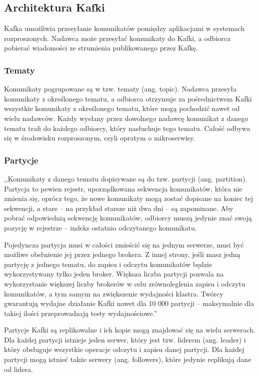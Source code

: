 \subsection{Architektura Kafki}

Kafka umożliwia przesyłanie komunikatów pomiędzy aplikacjami w systemach rozproszonych. Nadawca może przesyłać komunikaty do Kafki, a odbiorca pobierać wiadomości ze strumienia publikowanego przez Kafkę.

\subsubsection{Tematy}
Komunikaty pogrupowane są w tzw. tematy (ang. topic). Nadawca przesyła komunikaty z określonego tematu, a odbiorca otrzymuje za pośrednictwem Kafki wszystkie komunikaty z określonego tematu, które mogą pochodzić nawet od wielu nadawców. Każdy wysłany przez dowolnego nadawcę komunikat z danego tematu trafi do każdego odbiorcy, który nasłuchuje tego tematu. Całość odbywa się w środowisku rozproszonym, czyli opratym o mikroserwisy.\cite{Kafka}

\subsubsection{Partycje}
,,Komunikaty z danego tematu dopisywane są do tzw. partycji (ang. partition). Partycja to pewien rejestr, uporządkowana sekwencja komunikatów, która nie zmienia się, oprócz tego, że nowe komunikaty mogą zostać dopisane na koniec tej sekwencji, a stare – na przykład starsze niż dwa dni – są zapominane. Aby pobrać odpowiednią sekwencję komunikatów, odbiorcy muszą jedynie znać swoją pozycję w rejestrze – indeks ostatnio odczytanego komunikatu.

Pojedyncza partycja musi w całości zmieścić się na jednym serwerze, musi być możliwe obsłużenie jej przez jednego brokera. Z innej strony, jeśli masz jedną partycję z jednego tematu, do zapisu i odczytu komunikatów będzie wykorzystywany tylko jeden broker. Większa liczba partycji pozwala na wykorzystanie większej liczby brokerów w celu zrównoleglenia zapisu i odczytu komunikatów, a tym samym na zwiększenie wydajności klastra. Twórcy gwarantują wydajne działanie Kafki nawet dla 10 000 partycji – maksymalnie dla takiej ilości przeprowadzają testy wydajnościowe.''\cite{Kafka}

Partycje Kafki są replikowalne i ich kopie mogą znajdować się na wielu serwerach. Dla każdej partycji istnieje jeden serwer, który jest tzw. liderem (ang. leader) i który obsługuje wszystkie operacje odczytu i zapisu danej partycji. Dla każdej partycji mogą istnieć także serwery (ang. followers), które jedynie replikują dane od lidera.\cite{Kafka} 

